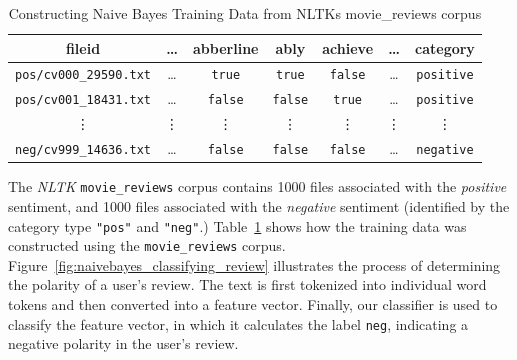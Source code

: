 \documentclass[11pt]{report} %
\begin{document}
\begin{table}[h]
	\centering
    \begin{tabular}{  c || c  c  c  c  c ||  c  }
    \hline\hline
    	 fileid & \dots & abberline & ably & achieve &\dots & category \\ \hline
	 \verb|pos/cv000_29590.txt|& \dots & \verb|true| & \verb|true| & \verb|false| &\dots & \verb|positive| \\ \hline
	 \verb|pos/cv001_18431.txt|& \dots & \verb|false| & \verb|false| & \verb|true| &\dots & \verb|positive| \\ \hline
	 \vdots & \vdots  & \vdots  & \vdots & \vdots &\vdots & \vdots \\ \hline
	 \verb|neg/cv999_14636.txt|& \dots & \verb|false| & \verb|false| & \verb|false| &\dots & \verb|negative| \\ \hline


    \hline
    \end{tabular}
\caption{Constructing Naive Bayes Training Data from NLTKs movie\_reviews corpus}
\label{fig:naivebayes}
\end{table}

The \textit{NLTK} \verb|movie_reviews| corpus contains 1000 files associated with the \textit{positive} sentiment, and 1000 files associated with the \textit{negative} sentiment (identified by the category type \verb|"pos"| and \verb|"neg"|.) Table~\ref{fig:naivebayes} shows how the training data was constructed using the \verb|movie_reviews| corpus. Figure~\ref{fig:naivebayes_classifying_review} illustrates the process of determining the polarity of a user's review. The text is first tokenized into individual word tokens and then converted into a feature vector. Finally, our classifier is used to classify the feature vector, in which it calculates the label \verb|neg|, indicating a negative polarity in the user's review.
\end{document}
